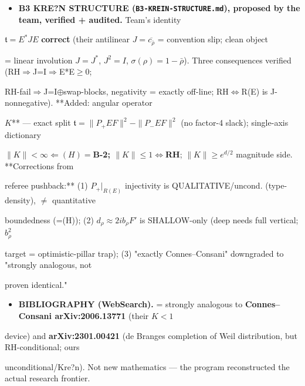 \documentclass[10pt]{article}
\begin{document}
\begin{itemize}
\item \textbf{B3 KRE?N STRUCTURE (\texttt{B3-KREIN-STRUCTURE.md}), proposed by the team, verified + audited.} Team's identity
\end{itemize}
  $\mathfrak t=E^*JE$ \textbf{correct} (their antilinear $J=\overline{c_{\bar\rho}}$ = convention slip; clean object\par
  = linear involution $J=J^*$, $J^2=I$, $\sigma(\rho)=1-\bar\rho$). Three consequences verified (RH\ensuremath{\Rightarrow}J=I\ensuremath{\Rightarrow}E*E\ensuremath{\ge}0;\par
  RH-fail\ensuremath{\Rightarrow}J=I\ensuremath{\oplus}swap-blocks, negativity = exactly off-line; RH\ensuremath{\iff}R(E) is J-nonnegative). **Added: angular operator\par
  $K$** --- exact split $\mathfrak t=\|P_+EF\|^2-\|P_-EF\|^2$ (no factor-4 slack); single-axis dictionary\par
  \textbf{$\|K\|<\infty\Leftarrow(H)=$B-2; $\|K\|\le1\iff$RH}; $\|K\|\ge e^{d/2}$ magnitude side. **Corrections from\par
  referee pushback:** (1) $P_+|_{R(E)}$ injectivity is QUALITATIVE/uncond. (type-density), \ensuremath{\ne} quantitative\par
  boundedness (=(H)); (2) $d_\rho\approx2ib_\rho F'$ is SHALLOW-only (deep needs full vertical; $b_\rho^2$\par
  target = optimistic-pillar trap); (3) "exactly Connes--Consani" downgraded to "strongly analogous, not\par
  proven identical."\par

\begin{itemize}
\item \textbf{BIBLIOGRAPHY (WebSearch).} = strongly analogous to \textbf{Connes--Consani arXiv:2006.13771} (their $K<1$
\end{itemize}
  device) and \textbf{arXiv:2301.00421} (de Branges completion of Weil distribution, but RH-conditional; ours\par
  unconditional/Kre?n). Not new mathematics --- the program reconstructed the actual research frontier.\par
\end{document}
